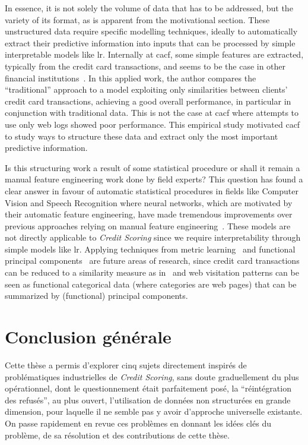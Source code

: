 In essence, it is not solely the volume of data that has to be addressed, but the variety of its format, as is apparent from the motivational section. These unstructured data require specific modelling techniques, ideally to automatically extract their predictive information into inputs that can be processed by simple interpretable models like \gls{lr}. Internally at \gls{cacf}, some simple features are extracted, typically from the credit card transactions, and seems to be the case in other financial institutions~\cite{verkade_2018}. In this applied work, the author compares the ``traditional'' approach to a model exploiting only similarities between clients' credit card transactions, achieving a good overall performance, in particular in conjunction with traditional data. This is not the case at \gls{cacf} where attempts to use only web logs showed poor performance. This empirical study motivated \gls{cacf} to study ways to structure these data and extract only the most important predictive information.

Is this structuring work a result of some statistical procedure or shall it remain a manual feature engineering work done by field experts? This question has found a clear answer in favour of automatic statistical procedures in fields like Computer Vision and Speech Recognition where neural networks, which are motivated by their automatic feature engineering, have made tremendous improvements over previous approaches relying on manual feature engineering~\cite{goodfellow2016deep}. These models are not directly applicable to \textit{Credit Scoring} since we require interpretability through simple models like \gls{lr}. Applying techniques from metric learning~\cite{2015BelletHS} and functional principal components~\cite{functional} are future areas of research, since credit card transactions can be reduced to a similarity measure as in~\cite{verkade_2018} and web visitation patterns can be seen as functional categorical data (where categories are web pages) that can be summarized by (functional) principal components.



\section{Conclusion générale}

Cette thèse a permis d'explorer cinq sujets directement inspirés de problématiques industrielles de \textit{Credit Scoring}, sans doute graduellement du plus opérationnel, dont le questionnement était parfaitement posé, la ``réintégration des refusés'', au plus ouvert, l'utilisation de données non structurées en grande dimension, pour laquelle il ne semble pas y avoir d'approche universelle existante. On passe rapidement en revue ces problèmes en donnant les idées clés du problème, de sa résolution et des contributions de cette thèse.

